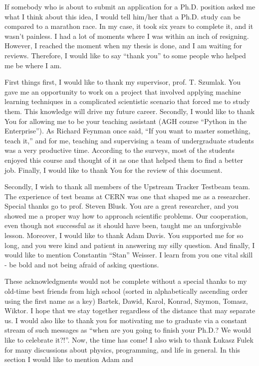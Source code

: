 
If somebody who is about to submit an application for a Ph.D. position asked me what I think about this idea, I would tell him/her that a Ph.D. study can be compared to a marathon race.  In my case, it took six years to complete it, and it wasn’t painless. I had a lot of moments where I was within an inch of resigning. However, I reached the moment when my thesis is done, and I am waiting for reviews. Therefore, I would like to say “thank you” to some people who helped me be where I am.
 
First things first, I would like to thank my supervisor, prof. T. Szumlak. You gave me an opportunity to work on a project that involved applying machine learning techniques in a complicated scientistic scenario that forced me to study them. This knowledge will drive my future career. Secondly, I would like to thank You for allowing me to be your teaching assistant (AGH course  “Python in the Enterprise”). As Richard Feynman once said, “If you want to master something, teach it,” and for me, teaching and supervising a team of undergraduate students was a very productive time. According to the surveys, most of the students enjoyed this course and thought of it as one that helped them to find a better job. Finally, I would like to thank You for the review of this document.  


Secondly, I wish to thank all members of the Upstream Tracker Testbeam team. The experience of test beams at CERN was one that shaped me as a researcher. 
Special thanks go to prof. Steven Blusk. You are a great researcher, and you showed me a proper way how to approach scientific problems. Our cooperation, even though not successful as it should have been, taught me an unforgivable lesson. Moreover, I would like to thank Adam Davis. You supported me for so long, and you were kind and patient in answering my silly question. And finally, I would like to mention Constantin “Stan” Weisser. I learn from you one vital skill -  be bold and not being afraid of asking questions. 


These acknowledgments would not be complete without a special thanks to my old-time best friends from high school (sorted in alphabetically ascending order using the first name as a key) Bartek, Dawid, Karol, Konrad, Szymon, Tomasz, Wiktor. I hope that we stay together regardless of the distance that may separate us. I would also like to thank you for motivating me to graduate via a constant stream of such messages as “when are you going to finish your Ph.D.? We would like to celebrate it?!”. Now, the time has come! 
I also wish to thank Łukasz Fulek for many discussions about physics, programming, and life in general. In this section I would like to mention Adam and 



